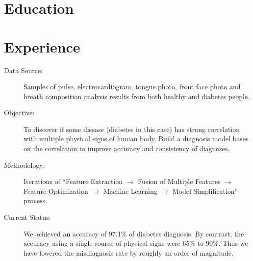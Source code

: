 \documentclass[10pt,a4paper]{moderncv/moderncv}
\begin{document}
\maketitle

\section{Education}


\section{Experience}
{
\begin{description}
	\item[Data Source:] Samples of pulse, electrocardiogram, tongue photo, front face photo and breath composition analysis results from both healthy and diabetes people.
	\item[Objective:] To discover if some disease (diabetes in this case) has strong correlation with multiple physical signs of human body. Build a diagnosis model bases on the correlation to improve accuracy and consistency of diagnoses.
	\item[Methodology:] Iterations of ``Feature Extraction $\rightarrow$ Fusion of Multiple Features $\rightarrow$ Feature Optimization $\rightarrow$ Machine Learning $\rightarrow$ Model Simplification'' process.
	\item[Current Status:]  We achieved an accuracy of 97.1\% of diabetes diagnosis. By contrast, the accuracy using a single source of physical signs were 65\% to 90\%. Thus we have lowered the misdiagnosis rate by roughly an order of magnitude.
\end{description}
}
\end{document}
